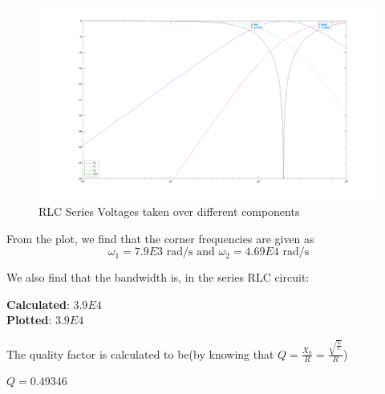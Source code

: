 
\begin{figure}[htbp]
    \centering
    \includegraphics[width=\textwidth]{images/prelab/parallel_RLC_series_plot.png}
    \caption{RLC Series Voltages taken over different components}
    \label{fig:prelab}
\end{figure}

From the plot, we find that the corner frequencies are given as
\begin{equation}
    \omega _1 = 7.9E3 \text{ rad/s} \text{ and } \omega _2 = 4.69E4 \text{ rad/s}
\end{equation}


We also find that the bandwidth is, in the series RLC circuit:

\begin{center}
    {\bf Calculated}: $3.9E4$
    \\
    {\bf Plotted}: $3.9E4$
\end{center}

The quality factor is calculated to be(by knowing that $Q = \frac{X_0}{R} = \frac{\sqrt{\frac{L}{C}}}{R}$)

\begin{center}
    \(Q=0.49346\)
\end{center}


